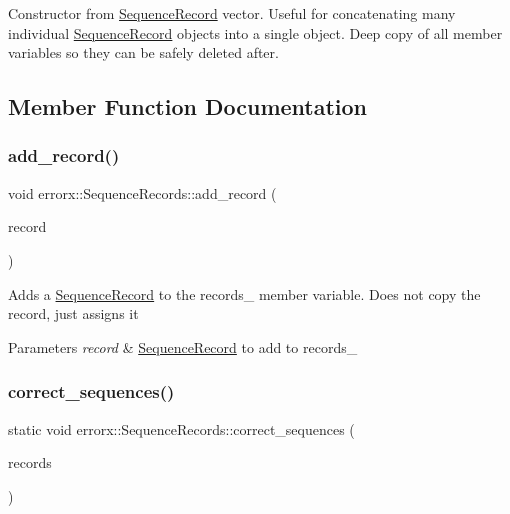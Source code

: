 Constructor from \mbox{\hyperlink{classerrorx_1_1_sequence_record}{Sequence\+Record}} vector. Useful for concatenating many individual \mbox{\hyperlink{classerrorx_1_1_sequence_record}{Sequence\+Record}} objects into a single object. Deep copy of all member variables so they can be safely deleted after. 

\subsection{Member Function Documentation}
\mbox{\label{classerrorx_1_1_sequence_records_aae76e748971bbf783b3463be77aa1a3f}} 
\subsubsection{\texorpdfstring{add\+\_\+record()}{add\_record()}}
{\footnotesize\ttfamily void errorx\+::\+Sequence\+Records\+::add\+\_\+record (\begin{DoxyParamCaption}\item[{\mbox{\hyperlink{classerrorx_1_1_sequence_record}{Sequence\+Record}} $\ast$}]{record }\end{DoxyParamCaption})}

Adds a \mbox{\hyperlink{classerrorx_1_1_sequence_record}{Sequence\+Record}} to the records\+\_\+ member variable. Does not copy the record, just assigns it


\begin{DoxyParams}{Parameters}
{\em record} & \mbox{\hyperlink{classerrorx_1_1_sequence_record}{Sequence\+Record}} to add to records\+\_\+ \\
\hline
\end{DoxyParams}
\mbox{\label{classerrorx_1_1_sequence_records_a6df0d323bdcb6f6f570e28fbdf2b6b34}} 
\subsubsection{\texorpdfstring{correct\+\_\+sequences()}{correct\_sequences()}}
{\footnotesize\ttfamily static void errorx\+::\+Sequence\+Records\+::correct\+\_\+sequences (\begin{DoxyParamCaption}\item[{\mbox{\hyperlink{classerrorx_1_1_sequence_records}{Sequence\+Records}} $\ast$\&}]{records }\end{DoxyParamCaption})\hspace{0.3cm}{\ttfamily [static]}}


